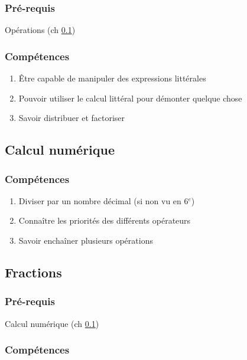 \subsubsection*{Pré-requis}
 Opérations (ch \ref{ch_5_op})
 
 \subsubsection*{Compétences}
\begin{enumerate}
	\item Être capable de manipuler des expressions littérales
	\item Pouvoir utiliser le calcul littéral pour démonter quelque chose
	\item Savoir distribuer et factoriser
\end{enumerate}

\subsection{Calcul numérique}\label{ch_5_op}

\subsubsection*{Compétences}
\begin{enumerate}
	\item Diviser par un nombre décimal (si non vu en 6$^e$)
	\item Connaître les priorités des différents opérateurs
	\item Savoir enchaîner plusieurs opérations
	
\end{enumerate}

\subsection{Fractions}\label{ch_5_frac}

\subsubsection*{Pré-requis}

Calcul numérique (ch \ref{ch_5_op})

\subsubsection*{Compétences}

